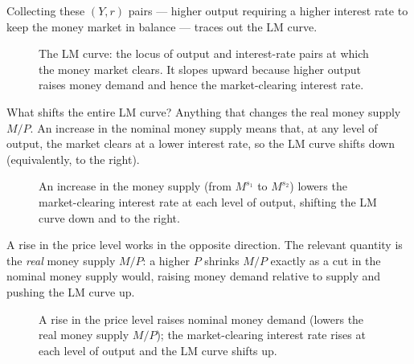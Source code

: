 Collecting these $(Y,r)$ pairs --- higher output requiring a higher interest rate to keep the money market in balance --- traces out the LM curve.

\begin{figure}[h]
\centering

\caption{The LM curve: the locus of output and interest-rate pairs at which the money market clears. It slopes upward because higher output raises money demand and hence the market-clearing interest rate.}
\label{fig:macro-18}
\end{figure}


What shifts the entire LM curve? Anything that changes the real money supply $M/P$. An increase in the nominal money supply means that, at any level of output, the market clears at a lower interest rate, so the LM curve shifts down (equivalently, to the right).

\begin{figure}[h]
\centering

\caption{An increase in the money supply (from $M^{s_1}$ to $M^{s_2}$) lowers the market-clearing interest rate at each level of output, shifting the LM curve down and to the right.}
\label{fig:macro-19}
\end{figure}

A rise in the price level works in the opposite direction. The relevant quantity is the \emph{real} money supply $M/P$: a higher $P$ shrinks $M/P$ exactly as a cut in the nominal money supply would, raising money demand relative to supply and pushing the LM curve up.

\begin{figure}[h]
\centering

\caption{A rise in the price level raises nominal money demand (lowers the real money supply $M/P$); the market-clearing interest rate rises at each level of output and the LM curve shifts up.}
\label{fig:macro-20}
\end{figure}


